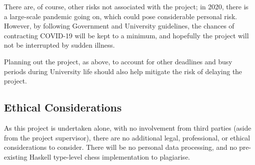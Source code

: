 \documentclass[12pt, a4paper]{scrartcl}
\begin{document}
There are, of course, other risks not associated with the project; in 2020, there is a large-scale pandemic going on, which could pose considerable personal risk. However, by following Government and University guidelines, the chances of contracting COVID-19 will be kept to a minimum, and hopefully the project will not be interrupted by sudden illness.

Planning out the project, as above, to account for other deadlines and busy periods during University life should also help mitigate the risk of delaying the project.

\subsection{Ethical Considerations}

As this project is undertaken alone, with no involvement from third parties (aside from the project supervisor), there are no additional legal, professional, or ethical considerations to consider. There will be no personal data processing, and no pre-existing Haskell type-level chess implementation to plagiarise.
\end{document}
